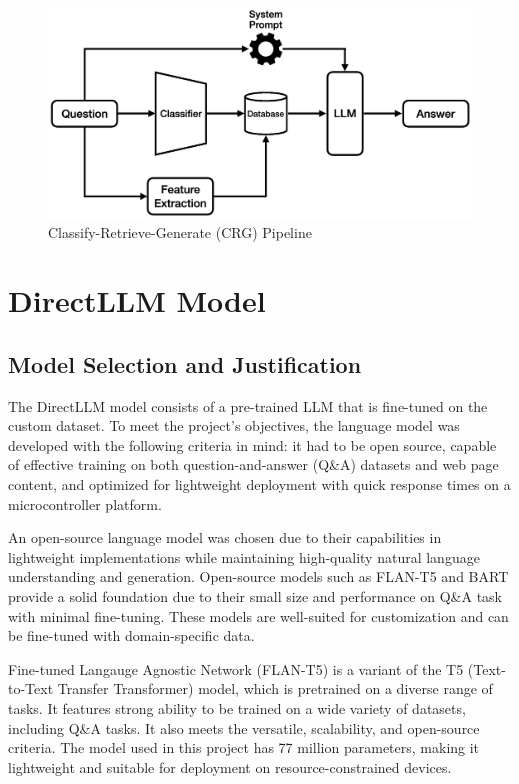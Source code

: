 \documentclass[conference]{IEEEtran}
\begin{document}
\begin{figure}[t]
    \centering
    \includegraphics[width=0.60\linewidth]{assets/crg_diagram.png}
    \caption{Classify-Retrieve-Generate (CRG) Pipeline}
    \label{fig:crg_flow}
\end{figure}

\section{DirectLLM Model}
\subsection{Model Selection and Justification}
The DirectLLM model consists of a pre-trained LLM that is fine-tuned on the custom dataset.
To meet the project's objectives, the language model was developed with the following criteria in mind: it had to be open source, capable of effective training on both question-and-answer (Q\&A) datasets and web page content, and optimized for lightweight deployment with quick response times on a microcontroller platform.

An open-source language model was chosen due to their capabilities in lightweight implementations while maintaining high-quality natural language understanding and generation.
Open-source models such as FLAN-T5 \cite{b8} and BART \cite{b9} provide a solid foundation due to their small size and performance on Q\&A task with minimal fine-tuning. 
These models are well-suited for customization and can be fine-tuned with domain-specific data.

Fine-tuned Langauge Agnostic Network (FLAN-T5) is a variant of the T5 (Text-to-Text Transfer Transformer) model, which is pretrained on a diverse range of tasks. 
It features strong ability to be trained on a wide variety of datasets, including Q\&A tasks. 
It also meets the versatile, scalability, and open-source criteria. 
The model used in this project has 77 million parameters, making it lightweight and suitable for deployment on resource-constrained devices.
\end{document}

